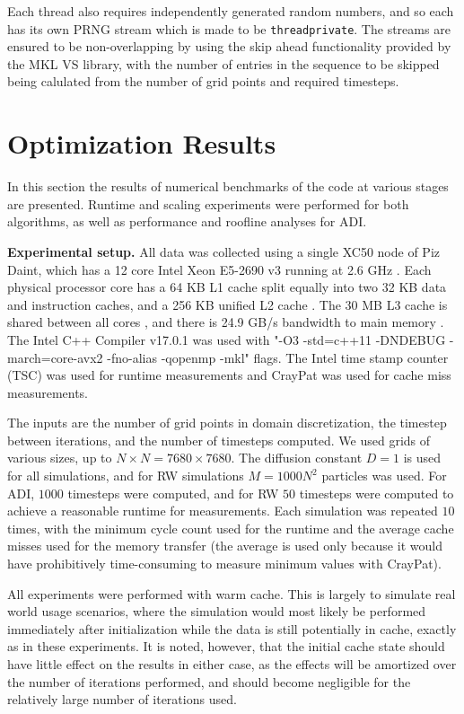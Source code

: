 \documentclass[letterpaper]{article}
\newcommand{\mypar}[1]{{\bf #1.}}
\begin{document}
Each thread also requires independently generated random numbers, and so each has its own PRNG stream which is made to be {\tt threadprivate}. The streams are ensured to be non-overlapping by using the skip ahead functionality provided by the MKL VS library, with the number of entries in the sequence to be skipped being calulated from the number of grid points and required timesteps.


\section{Optimization Results}\label{sec:results}

In this section the results of numerical benchmarks of the code at various stages are presented. Runtime and scaling experiments were performed for both algorithms, as well as performance and roofline analyses for ADI.

\mypar{Experimental setup}
All data was collected using a single XC50 node of Piz Daint, which has a 12 core Intel Xeon E5-2690 v3 running at 2.6 GHz \cite{daint}. Each physical processor core has a 64 KB L1 cache split equally into two 32 KB data and instruction caches, and a 256 KB unified L2 cache \cite{cpu_world}. The 30 MB L3 cache is shared between all cores \cite{ark_intel}, and there is 24.9 GB/s bandwidth to main memory \cite{7_cpu}. The Intel C++ Compiler v17.0.1 was used with "-O3 -std=c++11 -DNDEBUG -march=core-avx2 -fno-alias -qopenmp -mkl" flags. The Intel time stamp counter (TSC) was used for runtime measurements and CrayPat was used for cache miss measurements.

The inputs are the number of grid points in domain discretization, the timestep between iterations, and the number of timesteps computed. We used grids of various sizes, up to $N\times N=7680\times7680$. The diffusion constant $D=1$ is used for all simulations, and for RW simulations $M=1000N^2$ particles was used. For ADI, $1000$ timesteps were computed, and for RW $50$ timesteps were computed to achieve a reasonable runtime for measurements. Each simulation was repeated $10$ times, with the minimum cycle count used for the runtime and the average cache misses used for the memory transfer (the average is used only because it would have prohibitively time-consuming to measure minimum values with CrayPat).

All experiments were performed with warm cache. This is largely to simulate real world usage scenarios, where the simulation would most likely be performed immediately after initialization while the data is still potentially in cache, exactly as in these experiments. It is noted, however, that the initial cache state should have little effect on the results in either case, as the effects will be amortized over the number of iterations performed, and should become negligible for the relatively large number of iterations used.
\end{document}
